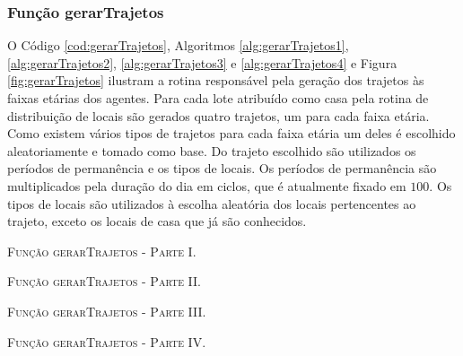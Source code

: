 \newpage

\subsubsection{Função gerarTrajetos}

O Código \ref{cod:gerarTrajetos}, Algoritmos \ref{alg:gerarTrajetos1}, \ref{alg:gerarTrajetos2}, \ref{alg:gerarTrajetos3} e \ref{alg:gerarTrajetos4} e Figura \ref{fig:gerarTrajetos} ilustram a rotina responsável pela geração dos trajetos às faixas etárias dos agentes. Para cada lote atribuído como casa pela rotina de distribuição de locais são gerados quatro trajetos, um para cada faixa etária. Como existem vários tipos de trajetos para cada faixa etária um deles é escolhido aleatoriamente e tomado como base. Do trajeto escolhido são utilizados os períodos de permanência e os tipos de locais. Os períodos de permanência são multiplicados pela duração do dia em ciclos, que é atualmente fixado em $100$. Os tipos de locais são utilizados à escolha aleatória dos locais pertencentes ao trajeto, exceto os locais de casa que já são conhecidos. 



\newpage

\begin{algorithm}[H]
   \SetAlgoLined   
   
   \caption{\textsc{Função gerarTrajetos - Parte I.}}
   \label{alg:gerarTrajetos1}
\end{algorithm}

\newpage

\begin{algorithm}[H]
   \SetAlgoLined   
   
   \caption{\textsc{Função gerarTrajetos - Parte II.}}
   \label{alg:gerarTrajetos2}
\end{algorithm}

\newpage

\begin{algorithm}[H]
   \SetAlgoLined   
   
   \caption{\textsc{Função gerarTrajetos - Parte III.}}
   \label{alg:gerarTrajetos3}
\end{algorithm}

\newpage

\begin{algorithm}[H]
   \SetAlgoLined   
   
   \caption{\textsc{Função gerarTrajetos - Parte IV.}}
   \label{alg:gerarTrajetos4}
\end{algorithm}

